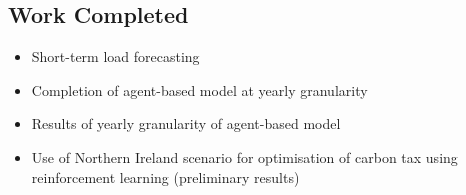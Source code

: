 \documentclass[12pt]{article}
\begin{document}
\subsection{Work Completed}

\begin{itemize}
  \item Short-term load forecasting
  \item Completion of agent-based model at yearly granularity
  \item Results of yearly granularity of agent-based model
  \item Use of Northern Ireland scenario for optimisation of carbon tax using reinforcement learning (preliminary results)
\end{itemize}





\clearpage
\end{document}
